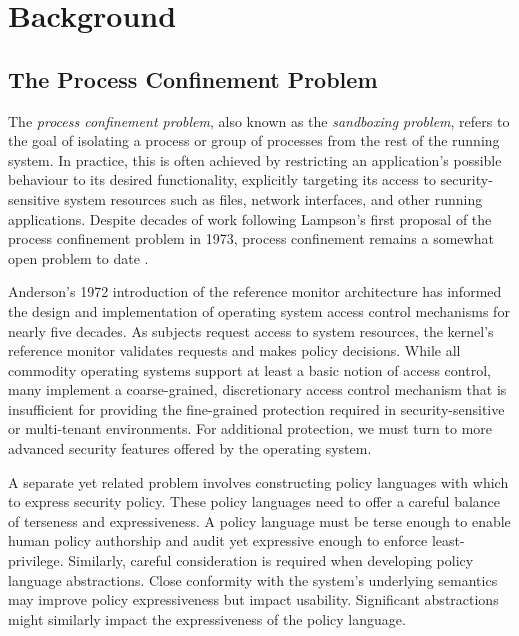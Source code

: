 \section{Background}
\label{sec:background}

\subsection{The Process Confinement Problem}

The \textit{process confinement problem}, also known as the \textit{sandboxing problem}, refers to the goal of isolating a process or group of processes from the rest of the running system. In practice, this is often achieved by restricting an application's possible behaviour to its desired functionality, explicitly targeting its access to security-sensitive system resources such as files, network interfaces, and other running applications.  Despite decades of work following Lampson's \cite{lampson1973_a_note} first proposal of the process confinement problem in 1973, process confinement remains a somewhat open problem to date \cite{crowell2013_confinement_problem}.

Anderson's 1972 introduction of the reference monitor architecture \cite{anderson1973_planning_study}  has informed the design and implementation of operating system access control mechanisms for nearly five decades. As subjects request access to system resources, the kernel's reference monitor validates requests and makes policy decisions. While all commodity operating systems support at least a basic notion of access control, many implement a coarse-grained, discretionary access control mechanism that is insufficient for providing the fine-grained protection required in security-sensitive or multi-tenant environments. For additional protection, we must turn to more advanced security features offered by the operating system.

A separate yet related problem involves constructing policy languages with which to express security policy. These policy languages need to offer a careful balance of terseness and expressiveness. A policy language must be terse enough to enable human policy authorship and audit yet expressive enough to enforce least-privilege. Similarly, careful consideration is required when developing policy language abstractions. Close conformity with the system's underlying semantics may improve policy expressiveness but impact usability. Significant abstractions might similarly impact the expressiveness of the policy language.

